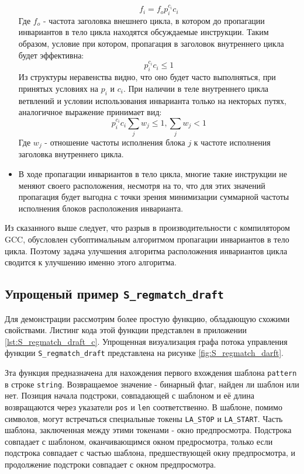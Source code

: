 \begin{itemize}
        $$ f_i = f_o  p_i^{c_i}  c_i $$
        Где $f_o$ - частота заголовка внешнего цикла, в котором до пропагации инвариантов в тело цикла находятся обсуждаемые инструкции.
        Таким образом, условие при котором, пропагация в заголовок внутреннего цикла будет эффективна:
        $$ p_i^{c_i}  c_i \leq 1 $$
        Из структуры неравенства видно, что оно будет часто выполняться, при принятых условиях на $p_i$ и $c_i$.
        При наличии в теле внутреннего цикла ветвлений и условии использования инварианта только на некторых путях, аналогичное выражение принимает вид:
        $$ p_i^{c_i} c_i \sum_j{w_j} \leq 1 , \sum_j{w_j} < 1 $$
        Где $w_j$ - отношение частоты исполнения блока $j$ к частоте исполнения заголовка внутреннего цикла.
    \item В ходе пропагации инвариантов в тело цикла, многие такие инструкции не меняют своего расположения, несмотря на то, что для этих значений пропагация будет выгодна с точки зрения минимизации суммарной частоты исполнения блоков расположения инварианта.
\end{itemize}

Из сказанного выше следует, что разрыв в производительности с компилятором GCC, обусловлен субоптимальным алгоритмом пропагации инвариантов в тело цикла.
Поэтому задача улучшения алгоритма расположения инвариантов цикла сводится к улучшению именно этого алгоритма.

\subsection{Упрощеный пример \texttt{S\_regmatch\_draft}}

Для демонстрации рассмотрим более простую функцию, обладающую схожими свойствами.
Листинг кода этой функции представлен в приложении \ref{lst:S_regmatch_draft_c}.
Упрощенная визуализация графа потока управления функции \texttt{S\_regmatch\_draft} представлена на рисунке \ref{fig:S_regmatch_darft}.

Зта функция предназначена для нахождения первого вхождения шаблона \texttt{pattern} в строке \texttt{string}.
Возвращаемое значение - бинарный флаг, найден ли шаблон или нет.
Позиция начала подстроки, совпадающей с шаблоном и её длина возвращаются через указатели \texttt{pos} и \texttt{len} соответственно.
В шаблоне, помимо символов, могут встречаться специальные токены \texttt{LA\_STOP} и \texttt{LA\_START}.
Часть шаблона, заключенная между этими токенами - окно предпросмотра.
Подстрока совпадает с шаблоном, оканчивающимся окном предросмотра, только если подстрока совпадает с частью шаблона, предшествующей окну предпросмотра, и продолжение подстроки совпадает с окном предпросмотра.

